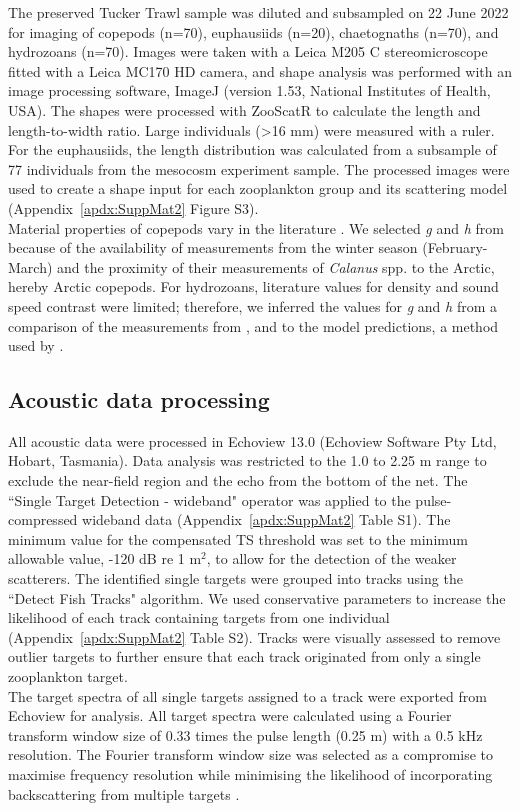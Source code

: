The preserved Tucker Trawl sample was diluted and subsampled on 22 June 2022 for imaging of copepods (n=70), euphausiids (n=20), chaetognaths (n=70), and hydrozoans (n=70). Images were taken with a Leica M205 C stereomicroscope fitted with a Leica MC170 HD camera, and shape analysis was performed with an image processing software, ImageJ (version 1.53, National Institutes of Health, USA). The shapes were processed with ZooScatR to calculate the length and length-to-width ratio. Large individuals (>16 mm) were measured with a ruler. For the euphausiids, the length distribution was calculated from a subsample of 77 individuals from the mesocosm experiment sample. The processed images were used to create a shape input for each zooplankton group and its scattering model (Appendix~\ref{apdx:SuppMat2} Figure S3).\\
Material properties of copepods vary in the literature \citep{Sakinan2019}. We selected \textit{g} and \textit{h} from \citet{Kogeler1987} because of the availability of measurements from the winter season (February-March) and the proximity of their measurements of \textit{Calanus} spp. to the Arctic, hereby Arctic copepods. For hydrozoans, literature values for density and sound speed contrast were limited; therefore, we inferred the values for \textit{g} and \textit{h} from a comparison of the measurements from \citet{Brierley2001}, \citet{Brierley2004} and \citet{Monger1998} to the model predictions, a method used by \citet{Lavery2007}.\\

\subsection{Acoustic data processing}
All acoustic data were processed in Echoview 13.0 (Echoview Software Pty Ltd, Hobart, Tasmania). Data analysis was restricted to the 1.0 to 2.25 m range to exclude the near-field region \citep{Simmonds2008} and the echo from the bottom of the net. The ``Single Target Detection - wideband" operator was applied to the pulse-compressed wideband data (Appendix~\ref{apdx:SuppMat2} Table S1). The minimum value for the compensated TS threshold was set to the minimum allowable value, -120 dB re 1 m$^2$, to allow for the detection of the weaker scatterers. The identified single targets were grouped into tracks using the ``Detect Fish Tracks" algorithm. We used conservative parameters to increase the likelihood of each track containing targets from one individual (Appendix~\ref{apdx:SuppMat2} Table S2). Tracks were visually assessed to remove outlier targets to further ensure that each track originated from only a single zooplankton target.\\
The target spectra of all single targets assigned to a track were exported from Echoview for analysis. All target spectra were calculated using a Fourier transform window size of 0.33 times the pulse length (0.25 m) with a 0.5 kHz resolution. The Fourier transform window size was selected as a compromise to maximise frequency resolution while minimising the likelihood of incorporating backscattering from multiple targets \citep{BenoitBird2020}.\\ 

